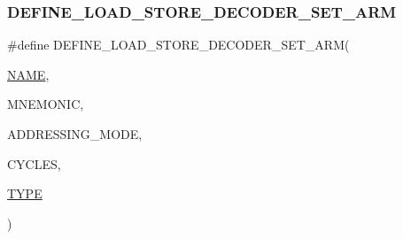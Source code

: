 \subsubsection{\texorpdfstring{D\+E\+F\+I\+N\+E\+\_\+\+L\+O\+A\+D\+\_\+\+S\+T\+O\+R\+E\+\_\+\+D\+E\+C\+O\+D\+E\+R\+\_\+\+S\+E\+T\+\_\+\+A\+RM}{DEFINE\_LOAD\_STORE\_DECODER\_SET\_ARM}}
{\footnotesize\ttfamily \#define D\+E\+F\+I\+N\+E\+\_\+\+L\+O\+A\+D\+\_\+\+S\+T\+O\+R\+E\+\_\+\+D\+E\+C\+O\+D\+E\+R\+\_\+\+S\+E\+T\+\_\+\+A\+RM(\begin{DoxyParamCaption}\item[{}]{\mbox{\hyperlink{inflate_8h_a164ea0159d5f0b5f12a646f25f99eceaa67bc2ced260a8e43805d2480a785d312}{N\+A\+ME}},  }\item[{}]{M\+N\+E\+M\+O\+N\+IC,  }\item[{}]{A\+D\+D\+R\+E\+S\+S\+I\+N\+G\+\_\+\+M\+O\+DE,  }\item[{}]{C\+Y\+C\+L\+ES,  }\item[{}]{\mbox{\hyperlink{inflate_8h_a164ea0159d5f0b5f12a646f25f99eceaab47ea8bb955afd0adc0ef98517dd6084}{T\+Y\+PE}} }\end{DoxyParamCaption})}

